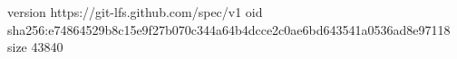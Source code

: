 version https://git-lfs.github.com/spec/v1
oid sha256:e74864529b8c15e9f27b070c344a64b4dcce2c0ae6bd643541a0536ad8e97118
size 43840

